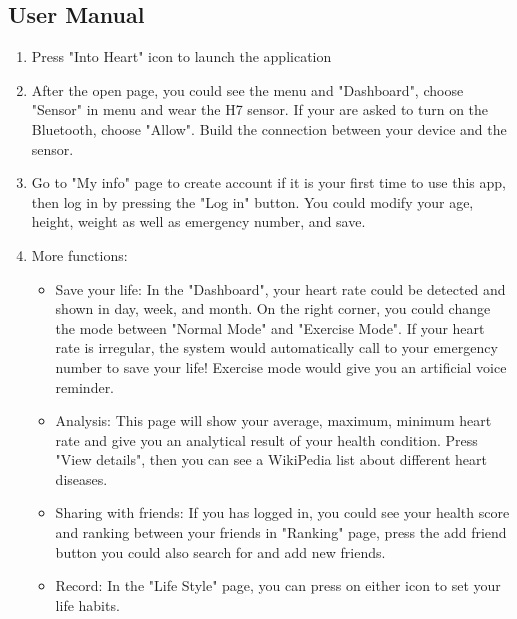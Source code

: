 \documentclass[10pt,a4paper,final]{scrartcl}
\begin{document}
\subsection{User Manual}
\begin{enumerate}
\item Press "Into Heart" icon to launch the application 
\item After the open page, you could see the menu and "Dashboard", choose "Sensor" in menu and wear the H7 sensor. If your are asked to turn on the Bluetooth, choose "Allow". Build the connection between your device and the sensor. 
\item Go to "My info" page to create account if it is your first time to use this app, then log in by pressing the "Log in" button. You could modify your age, height, weight as well as emergency number, and save.  
\item More functions: 
\begin{itemize}
\item Save your life: In the "Dashboard", your heart rate could be detected and shown in day, week, and month. On the right corner, you could change the mode between "Normal Mode" and "Exercise Mode". If your heart rate is irregular, the system would automatically call to your emergency number to save your life! Exercise mode would give you an artificial voice reminder. 
\item Analysis: This page will show your average, maximum, minimum heart rate and give you an analytical result of your health condition. Press "View details", then you can see a WikiPedia list about different heart diseases.  
\item Sharing with friends: If you has logged in, you could see your health score and ranking between your friends in "Ranking" page, press the add friend button you could also search for and add new friends. 
\item Record: In the "Life Style" page, you can press on either icon to set your life habits. 
\end{itemize}
\end{enumerate}

 
\theendnotes
 
\end{document}
